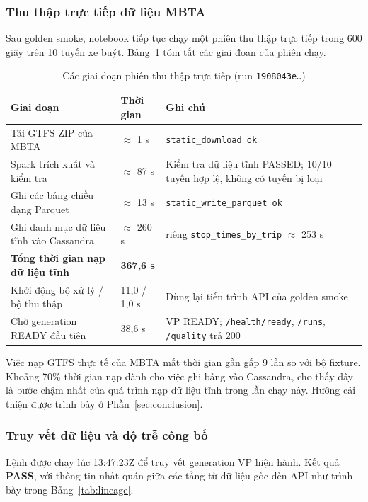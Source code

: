 \subsubsection{Thu thập trực tiếp dữ liệu MBTA}

Sau golden smoke, notebook tiếp tục chạy một phiên thu thập trực tiếp trong 600 giây trên 10 tuyến xe buýt. Bảng~\ref{tab:live} tóm tắt các giai đoạn của phiên chạy.

\begin{table}[H]
\centering
\tablefont
\caption{Các giai đoạn phiên thu thập trực tiếp (run \texttt{1908043e\ldots})}
\label{tab:live}
\begin{tabular}{p{6.40cm}p{2.32cm}p{6.40cm}}
\toprule
\textbf{Giai đoạn} & \textbf{Thời gian} & \textbf{Ghi chú} \\
\midrule
Tải GTFS ZIP của MBTA & $\approx$ 1 s & \texttt{static\_download ok} \\
Spark trích xuất và kiểm tra & $\approx$ 87 s & Kiểm tra dữ liệu tĩnh PASSED; 10/10 tuyến hợp lệ, không có tuyến bị loại \\
Ghi các bảng chiều dạng Parquet & $\approx$ 13 s & \texttt{static\_write\_parquet ok} \\
Ghi danh mục dữ liệu tĩnh vào Cassandra & $\approx$ 260 s & riêng \texttt{stop\_times\_by\_trip} $\approx$ 253 s \\
\textbf{Tổng thời gian nạp dữ liệu tĩnh} & \textbf{367,6 s} & \\
Khởi động bộ xử lý / bộ thu thập & 11,0 / 1,0 s & Dùng lại tiến trình API của golden smoke \\
Chờ generation READY đầu tiên & 38,6 s & VP READY; \texttt{/health/ready}, \texttt{/runs}, \texttt{/quality} trả 200 \\
\bottomrule
\end{tabular}
\end{table}

Việc nạp GTFS thực tế của MBTA mất thời gian gần gấp 9 lần so với bộ fixture. Khoảng 70\% thời gian nạp dành cho việc ghi bảng  vào Cassandra, cho thấy đây là bước chậm nhất của quá trình nạp dữ liệu tĩnh trong lần chạy này. Hướng cải thiện được trình bày ở Phần~\ref{sec:conclusion}.

\subsubsection{Truy vết dữ liệu và độ trễ công bố}

Lệnh  được chạy lúc 13:47:23Z để truy vết generation VP hiện hành. Kết quả \textbf{PASS}, với thông tin nhất quán giữa các tầng từ dữ liệu gốc đến API như trình bày trong Bảng~\ref{tab:lineage}.

